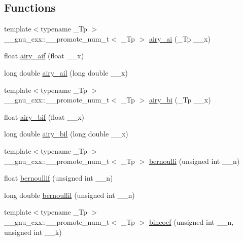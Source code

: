 \subsection*{Functions}
\begin{DoxyCompactItemize}
\item 
{\footnotesize template$<$typename \+\_\+\+Tp $>$ }\\\+\_\+\+\_\+gnu\+\_\+cxx\+::\+\_\+\+\_\+promote\+\_\+num\+\_\+t$<$ \+\_\+\+Tp $>$ \hyperlink{namespace____gnu__cxx_a8eff81346e95e9987002ea52fe1e29a7}{airy\+\_\+ai} (\+\_\+\+Tp \+\_\+\+\_\+x)
\item 
float \hyperlink{namespace____gnu__cxx_af317ba724c44b3a8271fe341d9870173}{airy\+\_\+aif} (float \+\_\+\+\_\+x)
\item 
long double \hyperlink{namespace____gnu__cxx_a800fdb61c672ae1831f4ca4250d657de}{airy\+\_\+ail} (long double \+\_\+\+\_\+x)
\item 
{\footnotesize template$<$typename \+\_\+\+Tp $>$ }\\\+\_\+\+\_\+gnu\+\_\+cxx\+::\+\_\+\+\_\+promote\+\_\+num\+\_\+t$<$ \+\_\+\+Tp $>$ \hyperlink{namespace____gnu__cxx_a65253611eb5aec804f9021b085be2a48}{airy\+\_\+bi} (\+\_\+\+Tp \+\_\+\+\_\+x)
\item 
float \hyperlink{namespace____gnu__cxx_a2ade465827bdba7370abbcce78e54912}{airy\+\_\+bif} (float \+\_\+\+\_\+x)
\item 
long double \hyperlink{namespace____gnu__cxx_a59240b3f40177e5187f3f194f624f0f8}{airy\+\_\+bil} (long double \+\_\+\+\_\+x)
\item 
{\footnotesize template$<$typename \+\_\+\+Tp $>$ }\\\+\_\+\+\_\+gnu\+\_\+cxx\+::\+\_\+\+\_\+promote\+\_\+num\+\_\+t$<$ \+\_\+\+Tp $>$ \hyperlink{namespace____gnu__cxx_a3fc87e918adf978bfdc26a182af0e6ed}{bernoulli} (unsigned int \+\_\+\+\_\+n)
\item 
float \hyperlink{namespace____gnu__cxx_abcd77f012ae74989c4bb9ca61978481d}{bernoullif} (unsigned int \+\_\+\+\_\+n)
\item 
long double \hyperlink{namespace____gnu__cxx_aac8f04abfdd6b744d11cb73ec1f564b1}{bernoullil} (unsigned int \+\_\+\+\_\+n)
\item 
{\footnotesize template$<$typename \+\_\+\+Tp $>$ }\\\+\_\+\+\_\+gnu\+\_\+cxx\+::\+\_\+\+\_\+promote\+\_\+num\+\_\+t$<$ \+\_\+\+Tp $>$ \hyperlink{namespace____gnu__cxx_a57a15003ded8e0e808b21d4a17a7803e}{bincoef} (unsigned int \+\_\+\+\_\+n, unsigned int \+\_\+\+\_\+k)
\item 

\end{DoxyCompactItemize}
